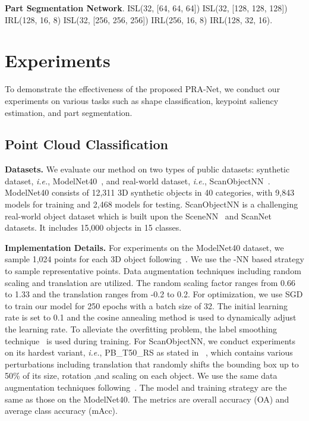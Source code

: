 \documentclass[journal]{IEEEtran}
\def\ie{\emph{i.e.}}
\begin{document}
\noindent\textbf{Part Segmentation Network}. ISL(32, [64, 64, 64])  ISL(32, [128, 128, 128])   IRL(128, 16, 8)   ISL(32, [256, 256, 256])  IRL(256, 16, 8)  IRL(128, 32, 16).

\begin{comment}
\noindent\textbf{Scene Segmentation Network}

ISL(32, [64, 64, 64])  ISL(32, [128, 128, 128])  IRL(256, 8, 16)  ISL(32, [256, 256, 256])  IRL(128, 16, 32)
\end{comment}

\section{Experiments} \label{sec:experiments}

To demonstrate the effectiveness of the proposed PRA-Net, we conduct our experiments on various tasks such as shape classification, keypoint saliency estimation, and part segmentation.

\subsection{Point Cloud Classification}

\noindent\textbf{Datasets.} We evaluate our method on two types of public datasets: synthetic dataset, \ie, ModelNet40~\cite{wu20153d}, and real-world dataset, \ie, ScanObjectNN~\cite{uy2019revisiting}. 
ModelNet40 consists of 12,311 3D synthetic objects in 40 categories, with 9,843 models for training and 2,468 models for testing. ScanObjectNN is a challenging real-world object dataset which is built upon the SceneNN~\cite{hua2016scenenn} and ScanNet~\cite{dai2017scannet} datasets. It includes 15,000 objects in 15 classes. 

\noindent\textbf{Implementation Details.} For experiments on the ModelNet40 dataset, we sample 1,024 points for each 3D object following~\cite{qi2017pointnet}. 
We use the -NN based strategy to sample representative points. Data augmentation techniques including random scaling and translation are utilized. The random scaling factor ranges from 0.66 to 1.33 and the translation ranges from \mbox{-0.2} to 0.2. For optimization, we use SGD to train our model for 250 epochs with a batch size of 32. The initial learning rate is set to 0.1 and the cosine annealing method is used to dynamically adjust the learning rate. To alleviate the overfitting problem, the label smoothing technique~\cite{Szegedy_2016_CVPR} is used during training. For ScanObjectNN, we conduct experiments on its hardest variant, \ie, PB\_T50\_RS as stated in ~\cite{uy2019revisiting}, which contains various perturbations including translation that randomly shifts the bounding box up to 50\% of its size, rotation ,and scaling on each object.
We use the same data augmentation techniques following~\cite{uy2019revisiting}. The model and training strategy are the same as those on the ModelNet40. The metrics are overall accuracy (OA) and average class accuracy (mAcc).
\end{document}

